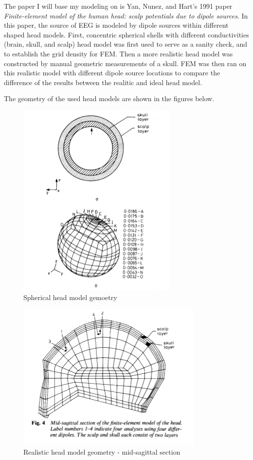 \documentclass{article}
\begin{document}
The paper I will base my modeling on is Yan, Nunez, and Hart's 1991 paper \emph{Finite-element model of the human head: scalp potentials due to dipole sources}\cite{Yan}. In this paper, the source of EEG is modeled by dipole sources within different shaped head models. First, concentric spherical shells with different conductivities (brain, skull, and scalp) head model was first used to serve as a sanity check, and to establish the grid density for FEM. Then a more realistic head model was constructed by manual geometric measurements of a skull. FEM was then ran on this realistic model with different dipole source locations to compare the difference of the results between the realitic and ideal head model.

The geometry of the used head models are shown in the figures below.

\begin{figure}[H]
    \begin{center}
        \includegraphics[scale=0.6]{sphere.png}
        \caption{Spherical head model gemoetry\cite{Yan}}
    \end{center}
\end{figure}

\begin{figure}[H]
    \begin{center}
        \includegraphics[scale=0.6]{head.png}
        \caption{Realistic head model geometry - mid-sagittal section \cite{Yan}}
    \end{center}
\end{figure}
\end{document}
